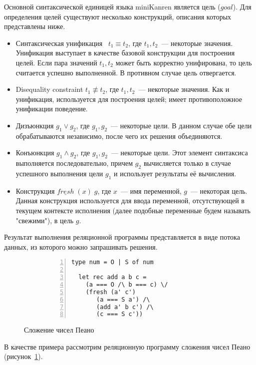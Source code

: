 Основной синтаксической единицей языка miniKanren является цель ($goal$). Для определения целей существуют несколько конструкций, описания которых представлены ниже.
\begin{itemize}
\item Синтаксическая унификация~\cite{lozov-spbu:Unify} $t_1 \equiv t_2$, где $t_1, t_2$~--- некоторые значения. Унификация выступает в качестве базовой конструкции для построения целей. Если пара значений $t_1, t_2$ может быть корректно унифирована, то цель считается успешно выполненной. В противном случае цель отвергается.
\item Disequality constraint $t_1 \not \equiv t_2$, где $t_1, t_2$~--- некоторые значения. Как и унификация, используется для построения целей; имеет противоположное унификации поведение.
\item Дизъюнкция $g_1 \vee g_2$, где $g_1, g_2$~--- некоторые цели. В данном случае обе цели обрабатываются независимо, после чего их решения объединяются.
\item Конъюнкция $g_1 \wedge g_2$, где $g_1, g_2$~--- некоторые цели. Этот элемент синтаксиса выполняется последовательно, причем $g_2$ вычисляется только в случае успешного выполнения цели $g_1$ и использует результаты её вычисления.
\item Конструкция $\underline{fresh} \; (x) \; g$, где $x$~--- имя переменной, $g$~--- некоторая цель. Данная конструкция используется для ввода переменной, отсутствующей в текущем контексте исполнения (далее подобные переменные будем называть "свежими"), в цель $g$.
\end{itemize}

Результат выполнения реляционной программы представляется в виде потока данных, из которого можно запрашивать решения.

\begin{figure}[h]
\centering
\begin{subfigure}[t]{0.4\textwidth}
\centering
\begin{lstlisting}[numbers=left,numberstyle=\small,stepnumber=1,numbersep=-5pt]
  type num = O | S of num

  let rec add a b c =
    (a === O /\ b === c) \/
    (fresh (a' c')
       (a === S a') /\
       (add a' b c') /\
       (c === S c'))
\end{lstlisting}
\end{subfigure}
\caption{Сложение чисел Пеано}
\label{lozov-spbu:peano}
\end{figure}

В качестве примера рассмотрим реляционную программу сложения чисел Пеано (рисунок~\ref{lozov-spbu:peano}).

